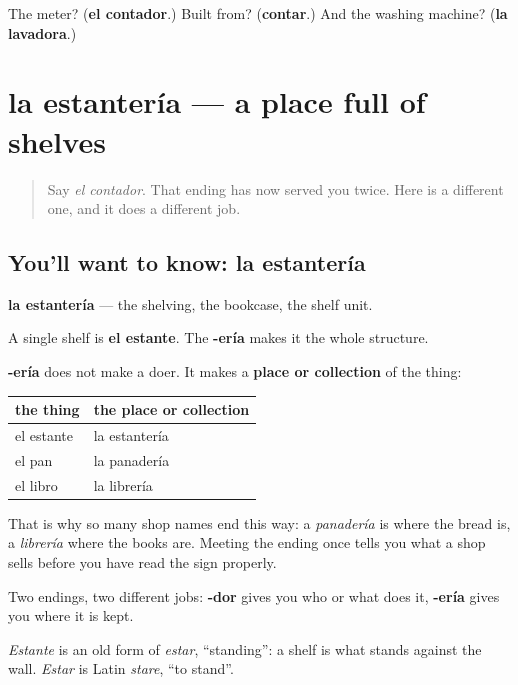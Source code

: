\begin{tcolorbox}[breakable,colback=teal!4,colframe=teal!35!black,title={Before you move on}]
The meter? (\textbf{el contador}.) Built from? (\textbf{contar}.) And the washing machine? (\textbf{la lavadora}.)
\end{tcolorbox}
\section[la estantería]{la estantería — a place full of shelves}

\label{lesson:ES-C432-estanteria}



\begin{quote}
Say \emph{el contador}. That ending has now served you twice. Here is a different one, and it does a different job.
\end{quote}

\subsection*{You'll want to know: la estantería}
\textbf{la estantería} — the shelving, the bookcase, the shelf unit.

A single shelf is \textbf{el estante}. The \textbf{-ería} makes it the whole structure.

\begin{cousinweb}
\textbf{-ería} does not make a doer. It makes a \textbf{place or collection} of the thing:

\noindent
\begin{tabularx}{\linewidth}{@{}>{\raggedright\arraybackslash}X>{\raggedright\arraybackslash}X@{}}
\toprule
\textbf{the thing} & \textbf{the place or collection} \\
\midrule
el estante & la estantería \\
el pan & la panadería \\
el libro & la librería \\
\bottomrule
\end{tabularx}

That is why so many shop names end this way: a \emph{panadería} is where the bread is, a \emph{librería} where the books are. Meeting the ending once tells you what a shop sells before you have read the sign properly.

Two endings, two different jobs: \textbf{-dor} gives you who or what does it, \textbf{-ería} gives you where it is kept.

\emph{Estante} is an old form of \emph{estar}, \textquotedblleft{}standing\textquotedblright{}: a shelf is what stands against the wall. \emph{Estar} is Latin \emph{stare}, \textquotedblleft{}to stand\textquotedblright{}.
\end{cousinweb}

